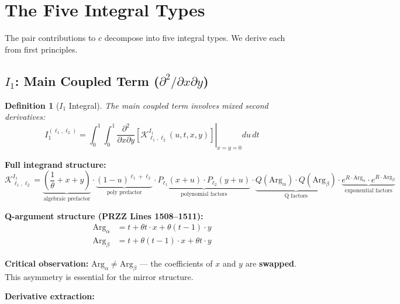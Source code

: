 \documentclass[11pt]{article}
\newtheorem{definition}{Definition}
\begin{document}
\section{The Five Integral Types}
\label{sec:integrals}

The pair contributions to $c$ decompose into five integral types. We derive each from first principles.

\subsection{$I_1$: Main Coupled Term ($\partial^2/\partial x \partial y$)}

\begin{definition}[$I_1$ Integral]
The main coupled term involves mixed second derivatives:
\begin{equation}
\boxed{
I_1^{(\ell_1,\ell_2)} = \int_0^1 \int_0^1 \left.\frac{\partial^2}{\partial x \partial y}\left[\mathcal{K}^{I_1}_{\ell_1,\ell_2}(u,t,x,y)\right]\right|_{x=y=0} du\, dt
}
\end{equation}
\end{definition}

\textbf{Full integrand structure:}
\begin{equation}
\mathcal{K}^{I_1}_{\ell_1,\ell_2} = \underbrace{\left(\frac{1}{\theta} + x + y\right)}_{\text{algebraic prefactor}} \cdot \underbrace{(1-u)^{\ell_1+\ell_2}}_{\text{poly prefactor}} \cdot \underbrace{P_{\ell_1}(x+u) \cdot P_{\ell_2}(y+u)}_{\text{polynomial factors}} \cdot \underbrace{Q(\text{Arg}_\alpha) \cdot Q(\text{Arg}_\beta)}_{\text{Q factors}} \cdot \underbrace{e^{R \cdot \text{Arg}_\alpha} \cdot e^{R \cdot \text{Arg}_\beta}}_{\text{exponential factors}}
\end{equation}

\textbf{Q-argument structure (PRZZ Lines 1508--1511):}
\begin{align}
\text{Arg}_\alpha &= t + \theta t \cdot x + \theta(t-1) \cdot y \\
\text{Arg}_\beta &= t + \theta(t-1) \cdot x + \theta t \cdot y
\end{align}

\textbf{Critical observation:} $\text{Arg}_\alpha \neq \text{Arg}_\beta$ --- the coefficients of $x$ and $y$ are \textbf{swapped}. This asymmetry is essential for the mirror structure.

\textbf{Derivative extraction:}
\end{document}
